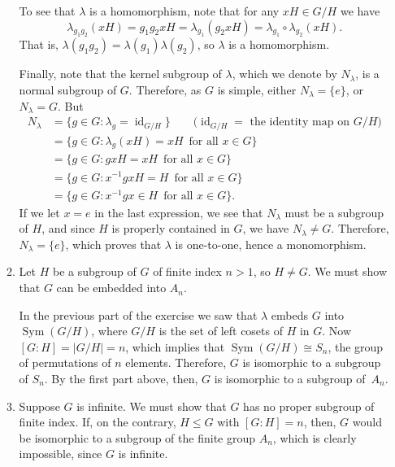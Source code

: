 \documentclass[12pt,reqno]{amsart}
\newcommand{\id}{\ensuremath{\operatorname{id}}}
\newcommand{\<}{\ensuremath{\langle}}
\renewcommand{\>}{\ensuremath{\rangle}}
\newcommand{\Sym}{\ensuremath{\operatorname{Sym}}}
\begin{document}
\begin{enumerate}
\begin{enumerate}
      To see that $\lambda$ is a homomorphism, note that for any $xH \in G/H$ we have
      \[
      \lambda_{g_1 g_2}(xH) = g_1g_2 xH = \lambda_{g_1}(g_2 x H) = 
      \lambda_{g_1}\circ \lambda_{g_2}( x H).
      \]
      That is, $\lambda(g_1 g_2) = \lambda(g_1)\lambda(g_2)$, so $\lambda$
      is a homomorphism.

      Finally, note that the kernel subgroup of $\lambda$, which we denote by
      $N_\lambda$, is a normal subgroup of $G$.  Therefore, as $G$ is simple,
      either $N_\lambda = \{e\}$, or $N_\lambda = G$.  But
      \begin{align*}
      N_\lambda &= \{g\in G: \lambda_g = \id_{G/H}\} \qquad \text{($\id_{G/H} = $ the identity map on $G/H$)}\\
      &= \{g\in G: \lambda_g(xH) = xH \, \text{ for all } x\in G \}\\
      &=\{g\in G: gxH = xH \, \text{ for all } x\in G \}\\
      &=\{g\in G: x^{-1}gxH = H \, \text{ for all } x\in G \}\\
      &=\{g\in G: x^{-1}g x \in H \, \text{ for all } x\in G\}.
      \end{align*}
      If we let $x = e$ in the last expression, we see that $N_\lambda$ must be
      a subgroup of $H$, and since $H$ is properly contained in $G$, we have
      $N_\lambda \neq G$.  Therefore, $N_\lambda = \{e\}$, which proves that
      $\lambda$ is one-to-one, hence a monomorphism.

      \medskip

      \item Let $H$ be a subgroup of $G$ of finite index $n>1$,
        so $H \neq G$.  We must show that $G$ can be embedded into $A_n$.

      In the previous part of the exercise we saw that $\lambda$ embeds $G$ into
      $\Sym(G/H)$, where $G/H$ is the set of left cosets of $H$ in $G$.  
      Now $[G:H] = |G/H| = n$, which implies
      that $\Sym(G/H) \cong S_n$, the group of permutations of $n$ elements.  Therefore,
      $G$ is isomorphic to a subgroup of $S_n$.  By the first part above, then, 
      $G$ is isomorphic to a subgroup of~$A_n$.

      \item Suppose $G$ is infinite.  We must show that $G$ has no proper subgroup of finite
      index.  If, on the contrary, $H\leq G$ with $[G:H] = n$, then, $G$ would be isomorphic
      to a subgroup of the finite group $A_n$, which is clearly impossible,
      since $G$ is infinite.

\end{enumerate}


\end{enumerate}
\end{document}
